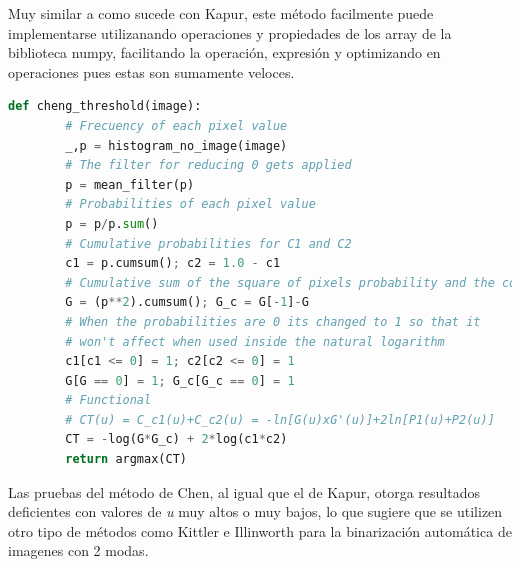 	\hfill\break
	\justifying
	Muy similar a como sucede con Kapur, este método facilmente puede implementarse utilizanando operaciones y propiedades de los array de la biblioteca numpy, facilitando la operación, expresión y optimizando en operaciones pues estas son sumamente veloces.
	
	\begin{lstlisting}[language=Python]
	def cheng_threshold(image):
		# Frecuency of each pixel value
		_,p = histogram_no_image(image)
		# The filter for reducing 0 gets applied
		p = mean_filter(p)
		# Probabilities of each pixel value
		p = p/p.sum()
		# Cumulative probabilities for C1 and C2
		c1 = p.cumsum(); c2 = 1.0 - c1
		# Cumulative sum of the square of pixels probability and the complement
		G = (p**2).cumsum(); G_c = G[-1]-G
		# When the probabilities are 0 its changed to 1 so that it
		# won't affect when used inside the natural logarithm
		c1[c1 <= 0] = 1; c2[c2 <= 0] = 1
		G[G == 0] = 1; G_c[G_c == 0] = 1
		# Functional
		# CT(u) = C_c1(u)+C_c2(u) = -ln[G(u)xG'(u)]+2ln[P1(u)+P2(u)]
		CT = -log(G*G_c) + 2*log(c1*c2)
		return argmax(CT)
	\end{lstlisting}
	
	\hfill\break
	\justifying
	Las pruebas del método de Chen, al igual que el de Kapur, otorga resultados deficientes con valores de \textit{u} muy altos o muy bajos, lo que sugiere que se utilizen otro tipo de métodos como Kittler e Illinworth para la binarización automática de imagenes con 2 modas.
	
